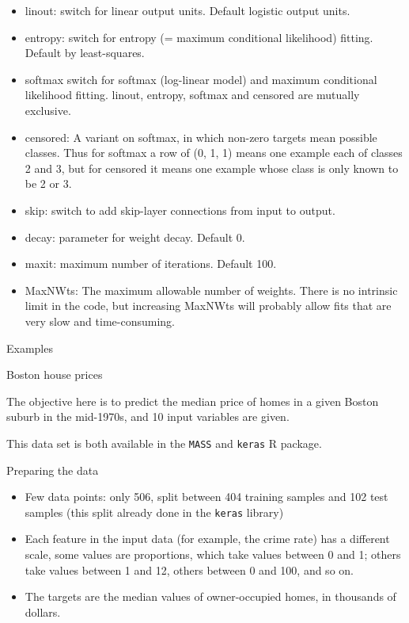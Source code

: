 \documentclass[10pt,ignorenonframetext,]{beamer}
\providecommand{\tightlist}{%
  \setlength{\itemsep}{0pt}\setlength{\parskip}{0pt}}
\begin{document}
\begin{frame}

\begin{itemize}
\tightlist
\item
  linout: switch for linear output units. Default logistic output units.
\item
  entropy: switch for entropy (= maximum conditional likelihood)
  fitting. Default by least-squares.
\item
  softmax switch for softmax (log-linear model) and maximum conditional
  likelihood fitting. linout, entropy, softmax and censored are mutually
  exclusive.
\item
  censored: A variant on softmax, in which non-zero targets mean
  possible classes. Thus for softmax a row of (0, 1, 1) means one
  example each of classes 2 and 3, but for censored it means one example
  whose class is only known to be 2 or 3.
\item
  skip: switch to add skip-layer connections from input to output.
\item
  decay: parameter for weight decay. Default 0.
\item
  maxit: maximum number of iterations. Default 100.
\item
  MaxNWts: The maximum allowable number of weights. There is no
  intrinsic limit in the code, but increasing MaxNWts will probably
  allow fits that are very slow and time-consuming.
\end{itemize}

\end{frame}

\begin{frame}[fragile]{Examples}
\protect\hypertarget{examples}{}

\begin{block}{Boston house prices}

The objective here is to predict the median price of homes in a given
Boston suburb in the mid-1970s, and 10 input variables are given.

This data set is both available in the \texttt{MASS} and \texttt{keras}
R package.

\begin{block}{Preparing the data}

\begin{itemize}
\tightlist
\item
  Few data points: only 506, split between 404 training samples and 102
  test samples (this split already done in the \texttt{keras} library)
\item
  Each feature in the input data (for example, the crime rate) has a
  different scale, some values are proportions, which take values
  between 0 and 1; others take values between 1 and 12, others between 0
  and 100, and so on.
\item
  The targets are the median values of owner-occupied homes, in
  thousands of dollars.
\end{itemize}

\end{block}

\end{block}

\end{frame}
\end{document}
